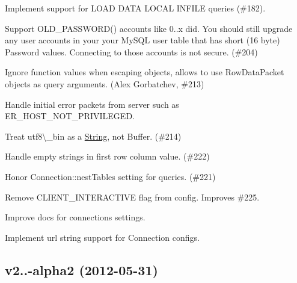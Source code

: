 \begin{DoxyItemize}
\item Implement support for {\ttfamily L\+O\+A\+D D\+A\+T\+A L\+O\+C\+A\+L I\+N\+F\+I\+L\+E} queries (\#182).
\item Support O\+L\+D\+\_\+\+P\+A\+S\+S\+W\+O\+R\+D() accounts like 0..\+x did. You should still upgrade any user accounts in your your My\+S\+Q\+L user table that has short (16 byte) Password values. Connecting to those accounts is not secure. (\#204)
\item Ignore function values when escaping objects, allows to use Row\+Data\+Packet objects as query arguments. (Alex Gorbatchev, \#213)
\item Handle initial error packets from server such as {\ttfamily E\+R\+\_\+\+H\+O\+S\+T\+\_\+\+N\+O\+T\+\_\+\+P\+R\+I\+V\+I\+L\+E\+G\+E\+D}.
\item Treat {\ttfamily utf8\textbackslash{}\+\_\+bin} as a \hyperlink{class_string}{String}, not Buffer. (\#214)
\item Handle empty strings in first row column value. (\#222)
\item Honor Connection\+::nest\+Tables setting for queries. (\#221)
\item Remove {\ttfamily C\+L\+I\+E\+N\+T\+\_\+\+I\+N\+T\+E\+R\+A\+C\+T\+I\+V\+E} flag from config. Improves \#225.
\item Improve docs for connections settings.
\item Implement url string support for Connection configs.
\end{DoxyItemize}

\subsection*{v2..-\/alpha2 (2012-\/05-\/31)}


